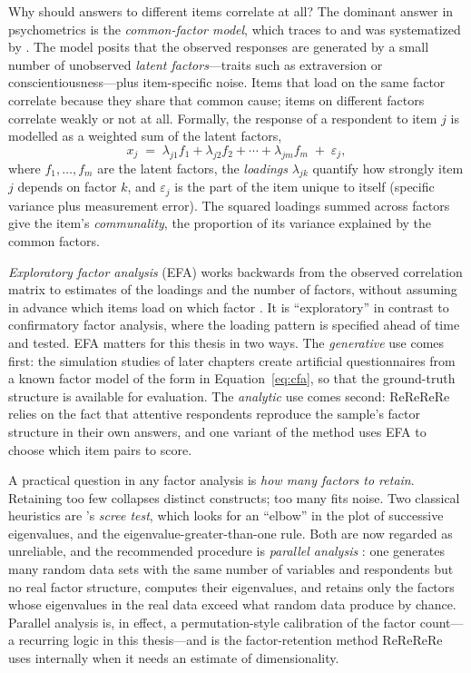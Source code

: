 \documentclass[doc,11pt,donotrepeattitle]{apa7}
\begin{document}
Why should answers to different items correlate at all? The dominant answer in
psychometrics is the \emph{common-factor model}, which traces to
\textcite{spearman1904general} and was systematized by
\textcite{thurstone1947multiple}. The model posits that the observed responses
are generated by a small number of unobserved \emph{latent factors}---traits
such as extraversion or conscientiousness---plus item-specific noise. Items that
load on the same factor correlate because they share that common cause; items on
different factors correlate weakly or not at all. Formally, the response of a
respondent to item $j$ is modelled as a weighted sum of the latent factors,
\begin{equation}
x_j \;=\; \lambda_{j1} f_1 + \lambda_{j2} f_2 + \cdots + \lambda_{jm} f_m
\;+\; \varepsilon_j ,
\label{eq:cfa}
\end{equation}
where $f_1,\dots,f_m$ are the latent factors, the \emph{loadings}
$\lambda_{jk}$ quantify how strongly item $j$ depends on factor $k$, and
$\varepsilon_j$ is the part of the item unique to itself (specific variance plus
measurement error). The squared loadings summed across factors give the item's
\emph{communality}, the proportion of its variance explained by the common
factors.

\emph{Exploratory factor analysis} (EFA) works backwards from the observed
correlation matrix to estimates of the loadings and the number of factors,
without assuming in advance which items load on which factor
\parencite{fabrigar1999evaluating, costello2005best}. It is ``exploratory'' in
contrast to confirmatory factor analysis, where the loading pattern is specified
ahead of time and tested. EFA matters for this thesis in two ways. The
\emph{generative} use comes first: the simulation studies of later chapters
create artificial questionnaires from a known factor model of the form in
Equation~\ref{eq:cfa}, so that the ground-truth structure is available for
evaluation. The \emph{analytic} use comes second: ReReReRe relies on the fact
that attentive respondents reproduce the sample's factor structure in their own
answers, and one variant of the method uses EFA to choose which item pairs to
score.

A practical question in any factor analysis is \emph{how many factors to
retain}. Retaining too few collapses distinct constructs; too many fits noise.
Two classical heuristics are \textcite{cattell1966scree}'s \emph{scree test},
which looks for an ``elbow'' in the plot of successive eigenvalues, and the
eigenvalue-greater-than-one rule. Both are now regarded as unreliable, and the
recommended procedure is \emph{parallel analysis} \parencite{horn1965rationale}:
one generates many random data sets with the same number of variables and
respondents but no real factor structure, computes their eigenvalues, and
retains only the factors whose eigenvalues in the real data exceed what random
data produce by chance. Parallel analysis is, in effect, a permutation-style
calibration of the factor count---a recurring logic in this thesis---and is the
factor-retention method ReReReRe uses internally when it needs an estimate of
dimensionality.
\end{document}
